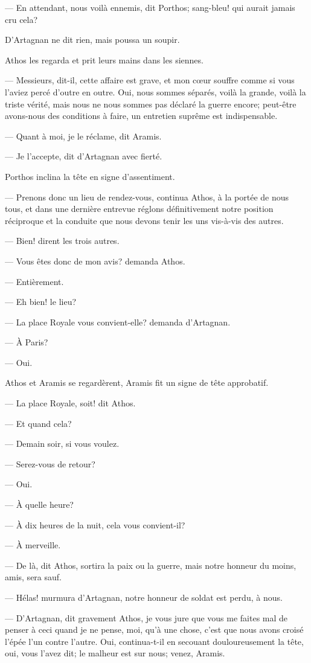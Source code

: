 — En attendant, nous voilà ennemis, dit Porthos; sang-bleu! qui aurait jamais cru cela?

D'Artagnan ne dit rien, mais poussa un soupir.

Athos les regarda et prit leurs mains dans les siennes.

— Messieurs, dit-il, cette affaire est grave, et mon cœur souffre comme si vous l'aviez percé d'outre en outre. Oui, nous sommes séparés, voilà la grande, voilà la triste vérité, mais nous ne nous sommes pas déclaré la guerre encore; peut-être avons-nous des conditions à faire, un entretien suprême est indispensable.

— Quant à moi, je le réclame, dit Aramis.

— Je l'accepte, dit d'Artagnan avec fierté.

Porthos inclina la tête en signe d'assentiment.

— Prenons donc un lieu de rendez-vous, continua Athos, à la portée de nous tous, et dans une dernière entrevue réglons définitivement notre position réciproque et la conduite que nous devons tenir les uns vis-à-vis des autres.

— Bien! dirent les trois autres.

— Vous êtes donc de mon avis? demanda Athos.

— Entièrement.

— Eh bien! le lieu?

— La place Royale vous convient-elle? demanda d'Artagnan.

— À Paris?

— Oui.

Athos et Aramis se regardèrent, Aramis fit un signe de tête approbatif.

— La place Royale, soit! dit Athos.

— Et quand cela?

— Demain soir, si vous voulez.

— Serez-vous de retour?

— Oui.

— À quelle heure?

— À dix heures de la nuit, cela vous convient-il?

— À merveille.

— De là, dit Athos, sortira la paix ou la guerre, mais notre honneur du moins, amis, sera sauf.

— Hélas! murmura d'Artagnan, notre honneur de soldat est perdu, à nous.

— D'Artagnan, dit gravement Athos, je vous jure que vous me faites mal de penser à ceci quand je ne pense, moi, qu'à une chose, c'est que nous avons croisé l'épée l'un contre l'autre. Oui, continua-t-il en secouant douloureusement la tête, oui, vous l'avez dit; le malheur est sur nous; venez, Aramis.

